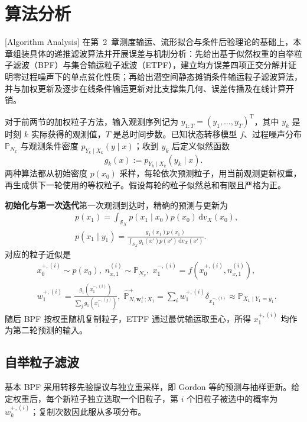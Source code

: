 \chapter{算法分析}[Algorithm Analysis]\label{cw:sec:algorithms}
在第~2~章测度输运、流形拟合与条件后验理论的基础上，本章组装具体的递推滤波算法并开展误差与机制分析：先给出基于似然权重的自举粒子滤波（BPF）与集合输运粒子滤波（ETPF），建立均方误差四项正交分解并证明零过程噪声下的单点贫化性质；再给出潜空间静态摊销条件输运粒子滤波算法，并与加权更新及逐步在线条件输运更新对比支撑集几何、误差传播及在线计算开销。

对于前两节的加权粒子方法，输入观测序列记为 $y_{1:T}=(y_1,\dots,y_T)^{\mathrm T}$，其中 $y_k$ 是时刻 $k$ 实际获得的观测值，$T$ 是总时间步数。已知状态转移模型 $f$、过程噪声分布 $\mathbb P_{N_x}$ 与观测条件密度 $p_{Y_k\mid X_k}(y\mid x)$；收到 $y_k$ 后定义似然函数
\begin{equation}
 g_k(x):=p_{Y_k\mid X_k}(y_k\mid x).
\end{equation}
两种算法都从初始密度 $p(x_0)$ 采样，每轮依次预测粒子，用当前观测更新权重，再生成供下一轮使用的等权粒子。假设每轮的粒子似然总和有限且严格为正。

\textbf{初始化与第一次迭代}\enspace 第一次观测到达时，精确的预测与更新为
\begin{equation}\label{cw:eq:algorithm-first-bayes}
\begin{aligned}
&p(x_1)=\int_{\mathcal S_X} p(x_1\mid x_0)p(x_0)\,\mathrm dv_X(x_0),\\
&p(x_1\mid y_1)=\frac{g_1(x_1)p(x_1)}{\displaystyle\int_{\mathcal S_X} g_1(x')p(x')\,\mathrm dv_X(x')}.
\end{aligned}
\end{equation}
对应的粒子近似是
\begin{equation}\label{cw:eq:algorithm-first-particles}
\begin{aligned}
&x_0^{+,(i)}\sim p(x_0),\;n_{x,1}^{(i)}\sim\mathbb P_{N_x},\;x_1^{-,(i)}=f(x_0^{+,(i)},n_{x,1}^{(i)}),\\
&w_1^{+,(i)}=\frac{g_1(x_1^{-,(i)})}{\sum_jg_1(x_1^{-,(j)})},\;
\hat{\mathbb P}_{N,\bm w_1^+;X_1}^+=\sum_iw_1^{+,(i)}\delta_{x_1^{-,(i)}}\approx\mathbb P_{X_1\mid Y_1=y_1}.
\end{aligned}
\end{equation}
随后 BPF 按权重随机复制粒子，ETPF 通过最优输运取重心，所得 $x_1^{+,(i)}$ 均作为第二轮预测的输入。

\section{自举粒子滤波}\label{cw:sec:alg-bpf}
基本 BPF 采用转移先验提议与独立重采样，即 Gordon 等\cite{gordon1993novel}的预测与抽样更新。给定权重后，每个新粒子独立选取一个旧粒子，第 $i$ 个旧粒子被选中的概率为 $w_k^{+,(i)}$；复制次数因此服从多项分布。

